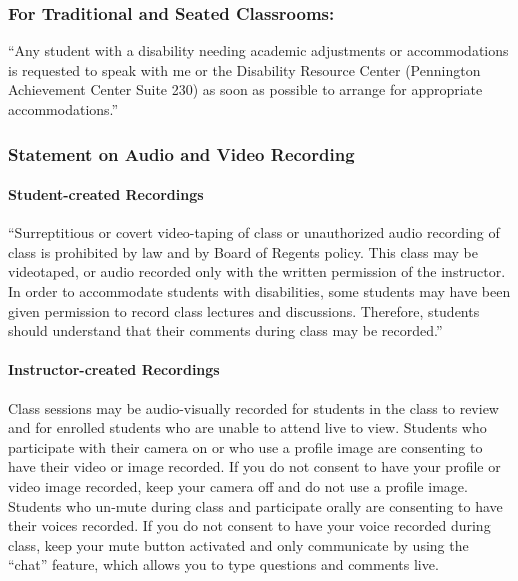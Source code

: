 \documentclass[
]{article}
\begin{document}
\hypertarget{for-traditional-and-seated-classrooms}{%
\subsubsection{For Traditional and Seated
Classrooms:}\label{for-traditional-and-seated-classrooms}}

``Any student with a disability needing academic adjustments or
accommodations is requested to speak with me or the Disability Resource
Center (Pennington Achievement Center Suite 230) as soon as possible to
arrange for appropriate accommodations.''

\hypertarget{statement-on-audio-and-video-recording-1}{%
\subsubsection{Statement on Audio and Video
Recording}\label{statement-on-audio-and-video-recording-1}}

\hypertarget{student-created-recordings}{%
\paragraph{Student-created
Recordings}\label{student-created-recordings}}

``Surreptitious or covert video-taping of class or unauthorized audio
recording of class is prohibited by law and by Board of Regents policy.
This class may be videotaped, or audio recorded only with the written
permission of the instructor. In order to accommodate students with
disabilities, some students may have been given permission to record
class lectures and discussions. Therefore, students should understand
that their comments during class may be recorded.''

\hypertarget{instructor-created-recordings}{%
\paragraph{Instructor-created
Recordings}\label{instructor-created-recordings}}

Class sessions may be audio-visually recorded for students in the class
to review and for enrolled students who are unable to attend live to
view. Students who participate with their camera on or who use a profile
image are consenting to have their video or image recorded. If you do
not consent to have your profile or video image recorded, keep your
camera off and do not use a profile image. Students who un-mute during
class and participate orally are consenting to have their voices
recorded. If you do not consent to have your voice recorded during
class, keep your mute button activated and only communicate by using the
``chat'' feature, which allows you to type questions and comments live.
\end{document}
